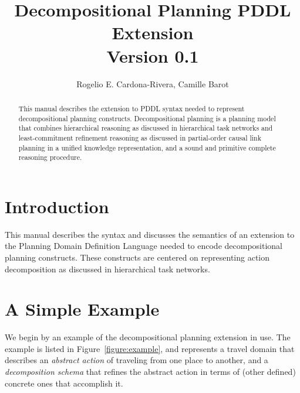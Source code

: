\documentclass[10pt]{article}
\title{Decompositional Planning PDDL Extension \\ \normalsize{Version 0.1}}
\author{Rogelio E. Cardona-Rivera, Camille Barot}
\begin{document}
\maketitle

\begin{abstract}
    This manual describes the extension to PDDL syntax needed to represent decompositional planning constructs. Decompositional planning is a planning model that combines hierarchical reasoning as discussed in hierarchical task networks and least-commitment refinement reasoning as discussed in partial-order causal link planning in a unified knowledge representation, and a sound and primitive complete reasoning procedure.
\end{abstract}

\section{Introduction}

This manual describes the syntax and discusses the semantics of an extension to the Planning Domain Definition Language needed to encode decompositional planning constructs. These constructs are centered on representing action decomposition as discussed in hierarchical task networks.

\newpage
\section{A Simple Example}

We begin by an example of the decompositional planning extension in use. The example is listed in Figure~\ref{figure:example}, and represents a travel domain that describes an \emph{abstract action} of traveling from one place to another, and a \emph{decomposition schema} that refines the abstract action in terms of (other defined) concrete ones that accomplish it.
\end{document}
